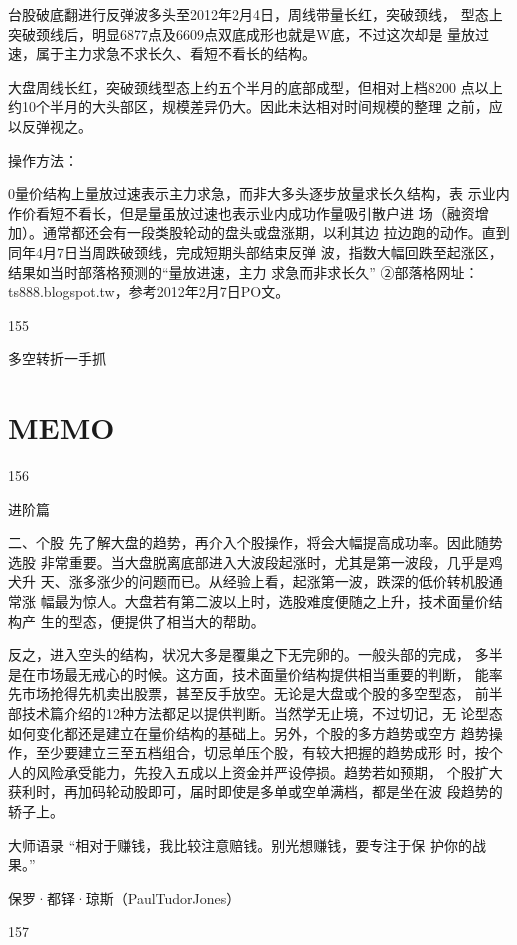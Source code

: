 \documentclass{article}
\begin{document}
台股破底翻进行反弹波多头至2012年2月4日，周线带量长红，突破颈线， 型态上突破颈线后，明显6877点及6609点双底成形也就是W底，不过这次却是 量放过速，属于主力求急不求长久、看短不看长的结构。

大盘周线长红，突破颈线型态上约五个半月的底部成型，但相对上档8200 点以上约10个半月的大头部区，规模差异仍大。因此未达相对时间规模的整理 之前，应以反弹视之。

操作方法：

0量价结构上量放过速表示主力求急，而非大多头逐步放量求长久结构，表 示业内作价看短不看长，但是量虽放过速也表示业内成功作量吸引散户进 场（融资增加）。通常都还会有一段类股轮动的盘头或盘涨期，以利其边 拉边跑的动作。直到同年4月7日当周跌破颈线，完成短期头部结束反弹 波，指数大幅回跌至起涨区，结果如当时部落格预测的“量放进速，主力 求急而非求长久” ②部落格网址：ts888.blogspot.tw，参考2012年2月7日PO文。

155

\clearpage

多空转折一手抓

\section{MEMO}

156

\clearpage

进阶篇

二、个股 先了解大盘的趋势，再介入个股操作，将会大幅提高成功率。因此随势选股 非常重要。当大盘脱离底部进入大波段起涨时，尤其是第一波段，几乎是鸡犬升 天、涨多涨少的问题而已。从经验上看，起涨第一波，跌深的低价转机股通常涨 幅最为惊人。大盘若有第二波以上时，选股难度便随之上升，技术面量价结构产 生的型态，便提供了相当大的帮助。

反之，进入空头的结构，状况大多是覆巢之下无完卵的。一般头部的完成， 多半是在市场最无戒心的时候。这方面，技术面量价结构提供相当重要的判断， 能率先市场抢得先机卖出股票，甚至反手放空。无论是大盘或个股的多空型态， 前半部技术篇介绍的12种方法都足以提供判断。当然学无止境，不过切记，无 论型态如何变化都还是建立在量价结构的基础上。另外，个股的多方趋势或空方 趋势操作，至少要建立三至五档组合，切忌单压个股，有较大把握的趋势成形 时，按个人的风险承受能力，先投入五成以上资金并严设停损。趋势若如预期， 个股扩大获利时，再加码轮动股即可，届时即使是多单或空单满档，都是坐在波 段趋势的轿子上。

大师语录 “相对于赚钱，我比较注意赔钱。别光想赚钱，要专注于保 护你的战果。”

保罗·都铎·琼斯（PaulTudorJones）

157
\end{document}
